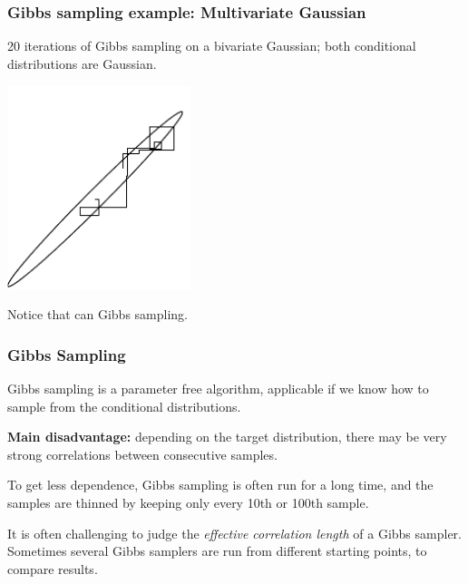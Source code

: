 \begin{frame}
\frametitle{Gibbs sampling example: Multivariate Gaussian}

20 iterations of Gibbs sampling on a bivariate Gaussian; both
conditional distributions are Gaussian.

\begin{center}
\includegraphics[width=0.4\textwidth]{bvg-gibbs}
\end{center}

Notice that  can  Gibbs sampling.
\end{frame}


\begin{frame}
\frametitle{Gibbs Sampling}

Gibbs sampling is a parameter free algorithm, applicable if we know
how to sample from the conditional distributions.

{\bf Main disadvantage:} depending on the target distribution, there may be
very strong correlations between consecutive samples.

To get less dependence, Gibbs sampling is often run for a long time,
and the samples are thinned by keeping only every 10th or 100th
sample.

It is often challenging to judge the \emph{effective correlation
  length} of a Gibbs sampler. Sometimes several Gibbs samplers are run
from different starting points, to compare results.
\end{frame}



